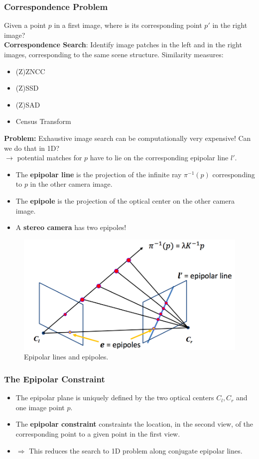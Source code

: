 \documentclass[a4paper,12 pt]{article}
\theoremstyle{definition}
\theoremstyle{remark}
\theoremstyle{definition}
\theoremstyle{definition}
\theoremstyle{definition}
\theoremstyle{remark}
\theoremstyle{definition}
\begin{document}
\subsubsection*{Correspondence Problem}
Given a point $p$ in a first image, where is its corresponding point $p'$ in the right image? \\
\textbf{Correspondence Search}: Identify image patches in the left and in the right images, corresponding to the same scene structure. Similarity measures:
\begin{itemize}
\item (Z)ZNCC
\item (Z)SSD
\item (Z)SAD
\item Census Transform
\end{itemize}
\textbf{Problem:} Exhaustive image search can be computationally very expensive! Can we do that in 1D?\\
$\rightarrow$ potential matches for $p$ have to lie on the corresponding epipolar line $l'$.
\begin{itemize}
\item The \textbf{epipolar line} is the projection of the infinite ray $\pi^{-1}(p)$ corresponding to $p$ in the other camera image.
\item The \textbf{epipole} is the projection of the optical center on the other camera image.
\item A \textbf{stereo camera} has two epipoles!
\end{itemize}
\begin{figure}[tbh]
\begin{center}
\includegraphics[scale=0.4]{pics/epi}
\caption{Epipolar lines and epipoles. \label{fig:epi}}
\end{center}
\end{figure}
\subsubsection*{The Epipolar Constraint}
\begin{itemize}
\item The epipolar plane is uniquely defined by the two optical centers $C_l,C_r$ and one image point $p$. 
\item The \textbf{epipolar constraint} constraints the location, in the second view, of the corresponding point to a given point in the first view.
\item $\Rightarrow$ This reduces the search to 1D problem along conjugate epipolar lines.
\end{itemize}
\end{document}
